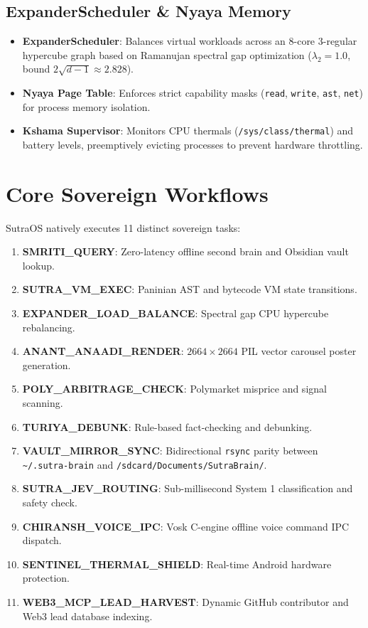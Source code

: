 \documentclass[10pt,journal,compsoc]{IEEEtran}
\begin{document}
\subsection{ExpanderScheduler \& Nyaya Memory}
\begin{itemize}
    \item \textbf{ExpanderScheduler}: Balances virtual workloads across an 8-core 3-regular hypercube graph based on Ramanujan spectral gap optimization ($\lambda_2 = 1.0$, bound $2\sqrt{d-1} \approx 2.828$).
    \item \textbf{Nyaya Page Table}: Enforces strict capability masks (\texttt{read}, \texttt{write}, \texttt{ast}, \texttt{net}) for process memory isolation.
    \item \textbf{Kshama Supervisor}: Monitors CPU thermals (\texttt{/sys/class/thermal}) and battery levels, preemptively evicting processes to prevent hardware throttling.
\end{itemize}

\section{Core Sovereign Workflows}
SutraOS natively executes 11 distinct sovereign tasks:
\begin{enumerate}
    \item \textbf{SMRITI\_QUERY}: Zero-latency offline second brain and Obsidian vault lookup.
    \item \textbf{SUTRA\_VM\_EXEC}: Paninian AST and bytecode VM state transitions.
    \item \textbf{EXPANDER\_LOAD\_BALANCE}: Spectral gap CPU hypercube rebalancing.
    \item \textbf{ANANT\_ANAADI\_RENDER}: $2664 \times 2664$ PIL vector carousel poster generation.
    \item \textbf{POLY\_ARBITRAGE_CHECK}: Polymarket misprice and signal scanning.
    \item \textbf{TURIYA\_DEBUNK}: Rule-based fact-checking and debunking.
    \item \textbf{VAULT\_MIRROR\_SYNC}: Bidirectional \texttt{rsync} parity between \texttt{\textasciitilde/.sutra-brain} and \texttt{/sdcard/Documents/SutraBrain/}.
    \item \textbf{SUTRA\_JEV\_ROUTING}: Sub-millisecond System 1 classification and safety check.
    \item \textbf{CHIRANSH\_VOICE\_IPC}: Vosk C-engine offline voice command IPC dispatch.
    \item \textbf{SENTINEL\_THERMAL\_SHIELD}: Real-time Android hardware protection.
    \item \textbf{WEB3\_MCP\_LEAD\_HARVEST}: Dynamic GitHub contributor and Web3 lead database indexing.
\end{enumerate}
\end{document}
